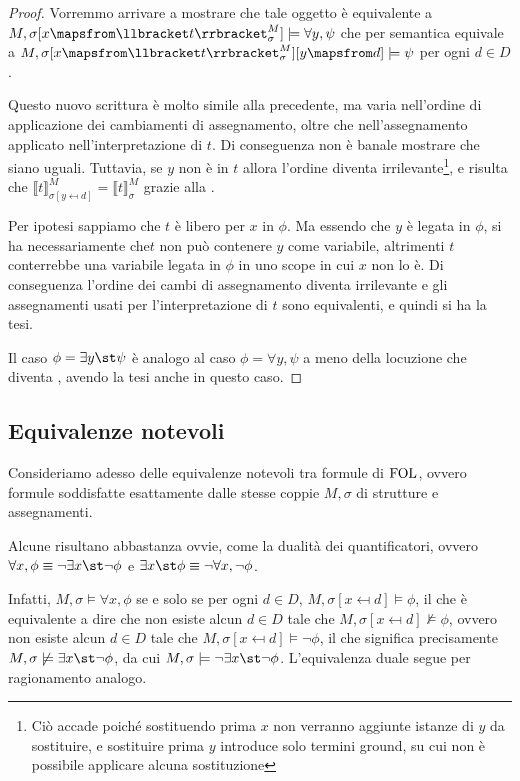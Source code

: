 \begin{proof}
  Vorremmo arrivare a mostrare che tale oggetto è equivalente a \(M,\sigma[x\mapsfrom \den{t}[M][\sigma]]\models \forall y,\psi\) che per semantica equivale a \(M,\sigma[x\mapsfrom \den{t}[M][\sigma]][y\mapsfrom d]\models \psi\) per ogni \(d \in D\).
  
  Questo nuovo scrittura è molto simile alla precedente, ma varia nell'ordine di applicazione dei cambiamenti di assegnamento, oltre che nell'assegnamento applicato nell'interpretazione di \(t\). Di conseguenza non è banale mostrare che siano uguali. Tuttavia, se \(y\) non è in \(t\) allora l'ordine diventa irrilevante\footnote{Ciò accade poiché sostituendo prima \(x\) non verranno aggiunte istanze di \(y\) da sostituire, e sostituire prima \(y\) introduce solo termini ground, su cui non è possibile applicare alcuna sostituzione}, e risulta che \(\llbracket t\rrbracket^M_{\sigma[y\mapsfrom d]} = \llbracket t\rrbracket^M_{\sigma}\) grazie alla .

  Per ipotesi sappiamo che \(t\) è libero per \(x\) in \(\phi\). Ma essendo che \(y\) è legata in \(\phi\), si ha necessariamente che\(t\) non può contenere \(y\) come variabile, altrimenti \(t\) conterrebbe una variabile legata in \(\phi\) in uno scope in cui \(x\) non lo è. Di conseguenza l'ordine dei cambi di assegnamento diventa irrilevante e gli assegnamenti usati per l'interpretazione di \(t\) sono equivalenti, e quindi si ha la tesi.

  Il caso \(\phi = \exists y\st \psi\) è analogo al caso \(\phi = \forall y, \psi\) a meno della locuzione  che diventa , avendo la tesi anche in questo caso.
\end{proof}


\subsection{Equivalenze notevoli}

Consideriamo adesso delle equivalenze notevoli tra formule di \(\FOL\), ovvero formule soddisfatte esattamente dalle stesse coppie \(M, \sigma\) di strutture e assegnamenti.

Alcune risultano abbastanza ovvie, come la dualità dei quantificatori, ovvero \(\forall x,\phi \equiv \neg \exists x\st \neg \phi\) e \(\exists x\st \phi \equiv \neg\forall x, \neg \phi\).

Infatti, \(M,\sigma\models \forall x,\phi\) se e solo se per ogni \(d\in D\), \(M,\sigma[x\mapsfrom d]\models \phi\), il che è equivalente a dire che non esiste alcun \(d\in D\) tale che \(M,\sigma[x\mapsfrom d]\not\models \phi\), ovvero non esiste alcun \(d\in D\) tale che \(M,\sigma[x\mapsfrom d]\models \neg \phi\), il che significa precisamente \(M,\sigma\not\models \exists x\st \neg \phi\), da cui \(M,\sigma\models \neg \exists x\st \neg \phi\). L'equivalenza duale segue per ragionamento analogo.

